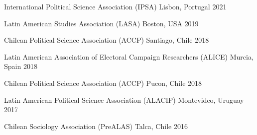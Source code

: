 





\vspace{1mm}

\begin{cvhonors}
\cvconf
{International Political Science Association (IPSA)} 
{Lisbon, Portugal}
{2021}
\end{cvhonors}

\begin{cvhonors}
\cvconf
{Latin American Studies Association (LASA)} 
{Boston, USA}
{2019}
\end{cvhonors}

\begin{cvhonors}
\cvconf
{Chilean Political Science Association (ACCP)} 
{Santiago, Chile}
{2018}
\end{cvhonors}

\begin{cvhonors}
\cvconf
{Latin American Association of Electoral Campaign Researchers (ALICE)} 
{Murcia, Spain}
{2018}
\end{cvhonors}

\begin{cvhonors}
\cvconf
{Chilean Political Science Association (ACCP)} 
{Pucon, Chile}
{2018}
\end{cvhonors}

\begin{cvhonors}
\cvconf
{Latin American Political Science Association (ALACIP)} 
{Montevideo, Uruguay}
{2017}
\end{cvhonors}

\begin{cvhonors}
\cvconf
{Chilean Sociology Association (PreALAS)} 
{Talca, Chile}
{2016}
\end{cvhonors}


